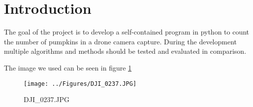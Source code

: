 \documentclass[../Head/Main.tex]{subfiles}
\begin{document}
\section{Introduction}

The goal of the project is to develop a self-contained program in python to count the number of pumpkins in a drone camera capture.
During the development multiple algorithms and methods should be tested and evaluated in comparison.

The image we used can be seen in figure \ref{fig:DJI_0237}

\begin{figure}[H]
	\centering
	\texttt{[image: ../Figures/DJI\_0237.JPG]}
	\caption{DJI\_0237.JPG}
	\label{fig:DJI_0237}
\end{figure}
\end{document}
